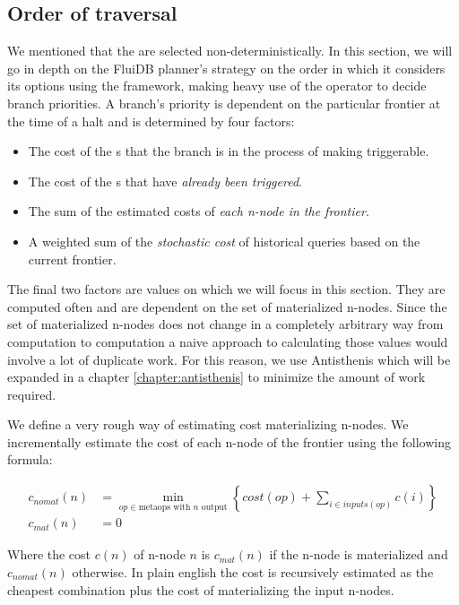 \subsection{Order of traversal}

We mentioned that the  are selected
non-deterministically. In this section, we will go in depth on the
FluiDB planner's strategy on the order in which it considers its
options using the  framework, making heavy use of the
 operator to decide branch priorities. A branch's priority
is dependent on the particular frontier at the time of a halt and is
determined by four factors:

\begin{itemize}
\item The cost of the s that the branch is in the process
  of making triggerable.
\item The cost of the s that have \emph{already been triggered}.
\item The sum of the estimated costs of \emph{each n-node in the frontier}.
\item A weighted sum of the \emph{stochastic cost} of historical queries based
on the current frontier.
\end{itemize}

The final two factors are values on which we will focus in this
section. They are computed often and are dependent on the set of
materialized n-nodes. Since the set of materialized n-nodes does not
change in a completely arbitrary way from computation to computation a
naive approach to calculating those values would involve a lot of
duplicate work. For this reason, we use Antisthenis which will be
expanded in a chapter \ref{chapter:antisthenis} to minimize the amount
of work required.

We define a very rough way
of estimating cost materializing n-nodes. We incrementally estimate the cost of each n-node
of the frontier using the following formula:

\begin{align*}
  c_{nomat}(n) &=
    \min\limits_{op \in \text{metaops with \(n\) output}} \left\{ cost(op) + \sum\limits_{i \in inputs(op)} c(i)  \right\} \\
  c_{mat}(n) &= 0
\end{align*}

Where the cost \(c(n)\) of n-node \(n\) is \(c_{mat}(n)\) if the n-node
is materialized and \(c_{nomat}(n)\) otherwise. In plain english the
cost is recursively estimated as the cheapest combination 
plus the cost of materializing the input n-nodes.

